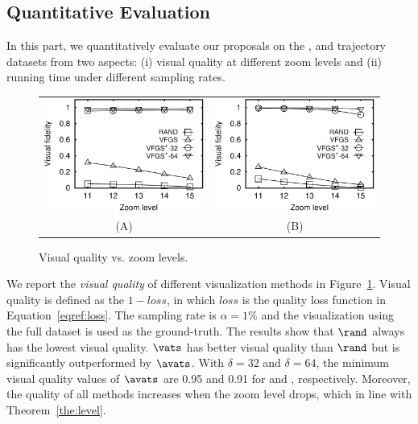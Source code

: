 \subsection{Quantitative Evaluation}\label{sec:quality}
In this part, we quantitatively evaluate our proposals on the \pt{}, \cd{} and \sz{} trajectory datasets from two aspects:
(i) visual quality at different zoom levels
and (ii) running time under different sampling rates.

\begin{figure}
 \centering
 \small
 \begin{tabular}{cc}
   \includegraphics[width=0.44\columnwidth]{pictures/fporto}
   &
   \includegraphics[width=0.44\columnwidth]{pictures/fshenzhen}
   \\
   (A) \pt{}
   &
   (B) \sz{}
 \end{tabular}
 \vspace{-3mm}
 \caption{Visual quality vs. zoom levels.}
 \label{fig:quality}
 \vspace{-3mm}
\end{figure}

We report the \textit{visual quality} of different visualization methods in Figure~\ref{fig:quality}. Visual quality is defined as the $1-loss$, in which $loss$ is the quality loss function in Equation~\eqref{eqref:loss}. The sampling rate is $\alpha=1\%$ and the visualization using the full dataset is used as the ground-truth. The results show that $\rand$ always has the lowest  visual quality. $\vats$ has better visual quality than $\rand$ but is significantly outperformed by $\avats$. With $\delta=32$ and $\delta=64$, the minimum visual quality values of $\avats$ are 0.95 and 0.91 for \pt{} and \sz{}, respectively. Moreover, the quality of all methods increases when the zoom level drops, which in line with Theorem~\ref{the:level}.


